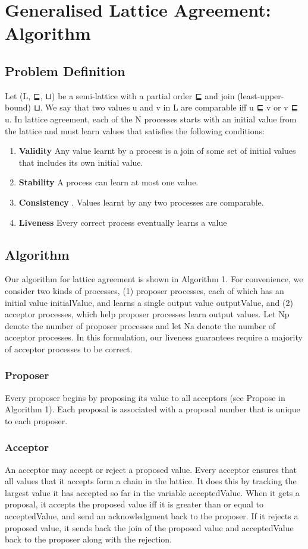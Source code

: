 \documentclass[a4paper,12pt]{report}
\begin{document}
\newpage
\chapter{Generalised Lattice Agreement: Algorithm}             %
\section{Problem Definition} Let (L, ⊑, ⊔) be a semi-lattice with
a partial order ⊑ and join (least-upper-bound) ⊔. We say
that two values u and v in L are comparable iff u ⊑ v or
v ⊑ u. In lattice agreement, each of the N processes starts
with an initial value from the lattice and must learn values
that satisfies the following conditions:
\begin{enumerate}
\item \textbf{Validity} Any value learnt by a process is a join of
some set of initial values that includes its own initial
value.
\item \textbf{Stability} A process can learn at most one value.
\item \textbf{Consistency} . Values learnt by any two processes are
comparable.
\item \textbf{Liveness} Every correct process eventually learns a value
\end{enumerate}
\section{Algorithm}
Our algorithm for lattice agreement is shown
in Algorithm 1. For convenience, we consider two kinds
of processes, (1) proposer processes, each of which has an
initial value initialValue, and learns a single output value
outputValue, and (2) acceptor processes, which help proposer
 processes learn output values. Let Np denote the number of proposer processes
and let Na denote the number of acceptor processes. In this
formulation, our liveness guarantees require a majority of
acceptor processes to be correct.
\subsection*{Proposer}
Every proposer begins by proposing its value to all acceptors 
(see Propose in Algorithm 1). Each proposal is associated
 with a proposal number that is unique to each proposer. 
\subsection*{Acceptor}
An acceptor may accept or reject a proposed value. Every
acceptor ensures that all values that it accepts form a chain
in the lattice. It does this by tracking the largest value it
has accepted so far in the variable acceptedValue. When it
gets a proposal, it accepts the proposed value iff it is greater
than or equal to acceptedValue, and send an acknowledgment
back to the proposer. If it rejects a proposed value, it
sends back the join of the proposed value and acceptedValue
back to the proposer along with the rejection.
\end{document}
